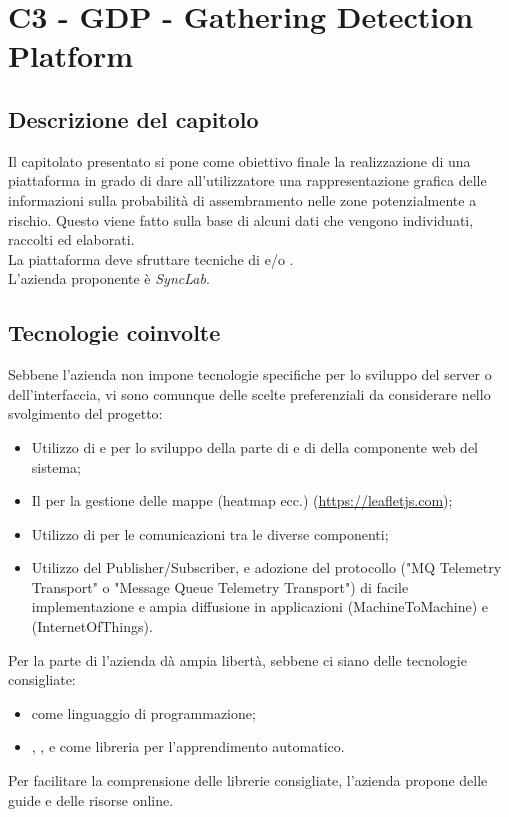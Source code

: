 \section{C3 - GDP - Gathering Detection Platform}

\subsection{Descrizione del capitolo}
Il capitolato presentato si pone come obiettivo finale la realizzazione di una piattaforma in grado di dare all'utilizzatore una rappresentazione grafica delle informazioni sulla probabilità di assembramento nelle zone potenzialmente a rischio. Questo viene fatto sulla base di alcuni dati che vengono individuati, raccolti ed elaborati. \\
La piattaforma deve sfruttare tecniche di  e/o .\\
L'azienda proponente è \textit{SyncLab}.

\subsection{Tecnologie coinvolte}
Sebbene l'azienda non impone tecnologie specifiche per lo sviluppo del server o dell'interfaccia, vi sono comunque delle scelte preferenziali da considerare nello svolgimento del progetto:
\begin{itemize}
\item Utilizzo di  e  per lo sviluppo della parte di  e di  della componente web del sistema;
\item Il   per la gestione delle mappe (heatmap ecc.) (\url{https://leafletjs.com});
\item Utilizzo di  per le comunicazioni tra le diverse componenti;
\item Utilizzo del  Publisher/Subscriber, e adozione del protocollo  ("MQ Telemetry Transport" o "Message Queue Telemetry Transport") di facile implementazione e ampia diffusione in applicazioni  (MachineToMachine) e  (InternetOfThings).
\end{itemize}
Per la parte di  l'azienda dà ampia libertà, sebbene ci siano delle tecnologie consigliate:
\begin{itemize}
\item {} come linguaggio di programmazione;
\item {}, ,  e  come libreria per l'apprendimento automatico.
\end{itemize}
Per facilitare la comprensione delle librerie consigliate, l'azienda propone delle guide e delle risorse online.

